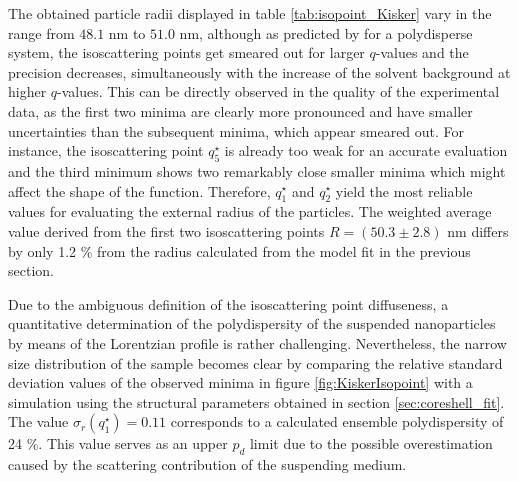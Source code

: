 The obtained particle radii displayed in table \ref{tab:isopoint_Kisker} vary in the range from \(48.1\) nm to \(51.0\) nm, although as predicted by \cite{kawaguchi_isoscattering_1992} for a polydisperse system, the isoscattering points get smeared out for larger \( q \)-values and the precision decreases, simultaneously with the increase of the solvent background at higher \(q\)-values. This can be directly observed in the quality of the experimental data, as the first two minima are clearly more pronounced and have smaller uncertainties than the subsequent minima, which appear smeared out. For instance, the isoscattering point \(q^{\star}_5\) is already too weak for an accurate evaluation and the third minimum shows two remarkably close smaller minima which might affect the shape of the function. Therefore, \(q^{\star}_1\) and \(q^{\star}_2\) yield the most reliable values for evaluating the external radius of the particles. The weighted average value derived from the first two isoscattering points \(R=\left(50.3\pm2.8 \right)\) nm differs by only 1.2 $\%$ from the radius calculated from the model fit in the previous section.
 
Due to the ambiguous definition of the isoscattering point diffuseness, a quantitative determination of the polydispersity of the suspended nanoparticles by means of the Lorentzian profile is rather challenging. Nevertheless, the narrow size distribution of the sample becomes clear by comparing the relative standard deviation values of the observed minima in figure \ref{fig:KiskerIsopoint} with a simulation using the structural parameters obtained in section \ref{sec:coreshell_fit}. The value \( \sigma_r(q^{\star}_1)=0.11 \) corresponds to a calculated ensemble polydispersity of 24 $\%$. This value serves as an upper \( p_d \) limit due to the possible overestimation caused by the scattering contribution of the suspending medium.


